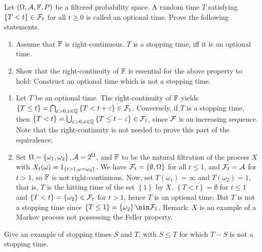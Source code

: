  Let $(\Omega, \mathcal A,
\mathbb F, P)$ be a filtered probability space. A random time $T$ satisfying
$\{T<t\}\in\mathcal F_{t}$ for all $t\geq 0$ is called an optional time. Prove the
following statements.
\begin{enumerate}
    \item Assume that $\mathbb F$ is right-continuous. $T$ is a stopping time, iff it
        is an optional time.
    \item Show that the right-continuity of $\mathbb F$ is essential for the above
        property to hold: Construct an optional time which is not a stopping
        time.
\end{enumerate}

\solution 
\begin{enumerate}
    \item Let $T$ be an optional time. The right-continuity of $\mathbb F$ yields
        $\left\{ T\leq t \right\} = \bigcap_{\varepsilon>0, \varepsilon\in\mathbb Q}
        \left\{ T<t+\varepsilon \right\} \in \mathcal F_{t}$. Conversely, if $T$ is a
        stopping time, then $\left\{ T<t \right\} =
        \bigcup_{\varepsilon>0,\varepsilon\in\mathbb Q} \left\{ T \leq t-\varepsilon
        \right\}\in \mathcal F_t$, since $\mathcal F$ is an increasing sequence. Note that the
        right-continuity is not needed to prove this part of the equivalence. 
    \item Set $\Omega = \left\{ \omega_{1}, \omega_{2} \right\}, \mathcal A =
        2^{\Omega}$, and $\mathbb F$ to be the natural filtration of the process $X$
        with $X_t(\omega) = 1_{ \left\{ t>1, \omega= \omega_{2} \right\} }$.
        We have $\mathcal F_{t} = \left\{ \emptyset, \Omega \right\}$ for all $t\leq
        1$, and $\mathcal F_{t} = \mathcal A$ for $t>1$, so $\mathbb F$ is not right-continuous.
        Now, set $T(\omega_{1}) = \infty$ and $T(\omega_{2}) = 1$, that is, $T$
        is the hitting time of the set $\left\{ 1 \right\}$ by $X$. $\left\{ T
        < t \right\} = \emptyset$ for $t\leq 1$ and $\left\{ T < t  \right\} =
        \left\{ \omega_{2} \right\} \in \mathcal F_{t}$ for $t>1$, hence $T$ is an
        optional time.  But $T$ is not a stopping time since $\left\{ {T\leq 1}
    \right\} = \left\{ \omega_{2} \right\} \nin \cF_{1}$. Remark: $X$ is an
    example of a Markov process not possessing the Feller property. 
\end{enumerate}


 Give an example of stopping times $S$
and $T$, with $S\leq T$ for which $T-S$ is not a stopping time. 

